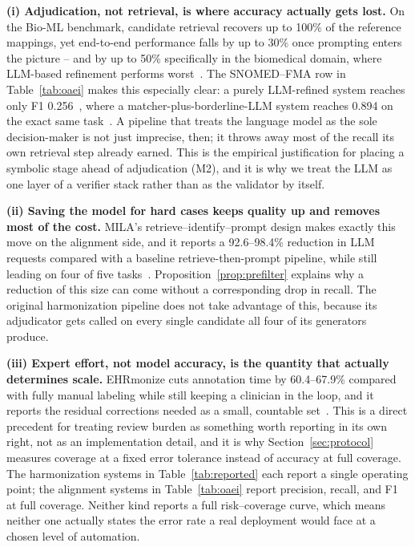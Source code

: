 \documentclass[conference]{IEEEtran}
\begin{document}
\textbf{(i) Adjudication, not retrieval, is where accuracy actually gets lost.} On the Bio-ML benchmark, candidate retrieval recovers up to 100\% of the reference mappings, yet end-to-end performance falls by up to 30\% once prompting enters the picture -- and by up to 50\% specifically in the biomedical domain, where LLM-based refinement performs worst~\cite{b54}. The SNOMED--FMA row in Table~\ref{tab:oaei} makes this especially clear: a purely LLM-refined system reaches only F1 0.256~\cite{b56}, where a matcher-plus-borderline-LLM system reaches 0.894 on the exact same task~\cite{b54}. A pipeline that treats the language model as the sole decision-maker is not just imprecise, then; it throws away most of the recall its own retrieval step already earned. This is the empirical justification for placing a symbolic stage ahead of adjudication (M2), and it is why we treat the LLM as one layer of a verifier stack rather than as the validator by itself.

\textbf{(ii) Saving the model for hard cases keeps quality up and removes most of the cost.} MILA's retrieve--identify--prompt design makes exactly this move on the alignment side, and it reports a 92.6--98.4\% reduction in LLM requests compared with a baseline retrieve-then-prompt pipeline, while still leading on four of five tasks~\cite{b54}. Proposition~\ref{prop:prefilter} explains why a reduction of this size can come without a corresponding drop in recall. The original harmonization pipeline does not take advantage of this, because its adjudicator gets called on every single candidate all four of its generators produce.

\textbf{(iii) Expert effort, not model accuracy, is the quantity that actually determines scale.} EHRmonize cuts annotation time by 60.4--67.9\% compared with fully manual labeling while still keeping a clinician in the loop, and it reports the residual corrections needed as a small, countable set~\cite{b40}. This is a direct precedent for treating review burden as something worth reporting in its own right, not as an implementation detail, and it is why Section~\ref{sec:protocol} measures coverage at a fixed error tolerance instead of accuracy at full coverage. The harmonization systems in Table~\ref{tab:reported} each report a single operating point; the alignment systems in Table~\ref{tab:oaei} report precision, recall, and F1 at full coverage. Neither kind reports a full risk--coverage curve, which means neither one actually states the error rate a real deployment would face at a chosen level of automation.
\end{document}
